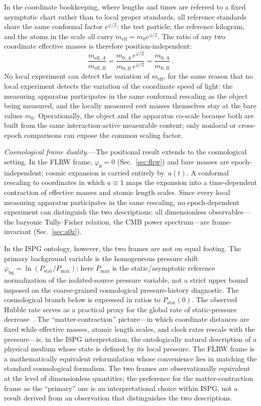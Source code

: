 \documentclass[aps,prd,onecolumn,superscriptaddress,nofootinbib,showpacs,12pt]{revtex4-2}
\begin{document}
In the coordinate bookkeeping, where lengths and times
are referred to a fixed asymptotic chart rather than to
local proper standards, all reference standards share
the same conformal factor $e^{\varphi/2}$: the test
particle, the reference kilogram, and the atoms in the
scale all carry $m_{\mathrm{eff}}=m_{0}e^{\varphi/2}$.
The ratio of any two coordinate effective masses is
therefore position-independent:
\begin{equation}\label{eq:mass_ratio}
  \frac{m_{\mathrm{eff},A}}{m_{\mathrm{eff},B}}
  = \frac{m_{0,A}\,e^{\varphi/2}}
         {m_{0,B}\,e^{\varphi/2}}
  = \frac{m_{0,A}}{m_{0,B}}\,.
\end{equation}
No local experiment can detect the variation of
$m_{\mathrm{eff}}$, for the same reason that no local
experiment detects the variation of the coordinate speed
of light: the measuring apparatus participates in the
same conformal rescaling as the object being measured,
and the locally measured rest masses themselves stay at
the bare values $m_{0}$.
Operationally, the object and the apparatus co-scale because both are built
from the same interaction-active measurable content; only nonlocal or
cross-epoch comparisons can expose the common scaling factor.

\textit{Cosmological frame duality.}---The positional
result extends to the cosmological setting.  In the FLRW
frame, $\varphi_0=0$ (Sec.~\ref{sec:flrw}) and bare masses
are epoch-independent; cosmic expansion is carried entirely
by~$a(t)$.  A conformal rescaling to coordinates in which
$a\equiv1$ maps the expansion into a time-dependent
contraction of effective masses and atomic length scales.
Since every local measuring apparatus participates in the
same rescaling, no epoch-dependent experiment can distinguish
the two descriptions; all dimensionless observables---the
baryonic Tully--Fisher relation, the CMB power spectrum---are
frame-invariant (Sec.~\ref{sec:a0z}).

In the ISPG ontology, however, the two frames are not on
equal footing.  The primary background variable is the
homogeneous pressure shift
$\varphi_{\mathrm{bg}}=\ln(P_{\mathrm{stat}}/P_{\max})$;
here $P_{\max}$ is the static/asymptotic reference
normalization of the isolated-source pressure variable,
not a strict upper bound imposed on the coarse-grained
cosmological pressure-history diagnostic.  The
cosmological branch below is expressed in ratios to
$P_{\mathrm{stat}}(0)$.
The observed Hubble rate serves as a practical proxy for
the global rate of static-pressure
decrease~\cite{Lotishvili2026MOND}.
The ``matter-contraction'' picture---in which coordinate
distances are fixed while effective masses, atomic length
scales, and clock rates rescale with the pressure---is,
in the ISPG interpretation, the ontologically natural
description of a physical medium whose state is defined
by its local pressure.  The FLRW frame is a
mathematically equivalent reformulation whose convenience
lies in matching the standard cosmological formalism.
The two frames are observationally equivalent at the
level of dimensionless quantities; the preference for
the matter-contraction frame as the ``primary'' one is
an interpretational choice within ISPG, not a result
derived from an observation that distinguishes the two
descriptions.
\end{document}
